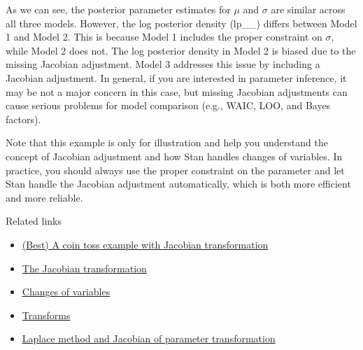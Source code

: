 \documentclass[
  letterpaper,
  DIV=11,
  numbers=noendperiod]{scrartcl}
\providecommand{\tightlist}{%
  \setlength{\itemsep}{0pt}\setlength{\parskip}{0pt}}\usepackage{longtable,booktabs,array}
\begin{document}
As we can see, the posterior parameter estimates for \(\mu\) and
\(\sigma\) are similar across all three models. However, the log
posterior density (lp\_\_) differs between Model 1 and Model 2. This is
because Model 1 includes the proper constraint on \(\sigma\), while
Model 2 does not. The log posterior density in Model 2 is biased due to
the missing Jacobian adjustment. Model 3 addresses this issue by
including a Jacobian adjustment. In general, if you are interested in
parameter inference, it may be not a major concern in this case, but
missing Jacobian adjustments can cause serious problems for model
comparison (e.g., WAIC, LOO, and Bayes factors).

Note that this example is only for illustration and help you understand
the concept of Jacobian adjustment and how Stan handles changes of
variables. In practice, you should always use the proper constraint on
the parameter and let Stan handle the Jacobian adjustment automatically,
which is both more efficient and more reliable.

Related links

\begin{itemize}
\tightlist
\item
  \href{https://rpubs.com/kaz_yos/stan_jacobian}{(Best) A coin toss
  example with Jacobian transformation}
\item
  \href{https://modelassist.epixanalytics.com/space/EA/26575402/The+Jacobian+transformation}{The
  Jacobian transformation}
\item
  \href{https://mc-stan.org/docs/stan-users-guide/reparameterization.html\#changes-of-variables}{Changes
  of variables}
\item
  \href{https://mc-stan.org/docs/reference-manual/transforms.html}{Transforms}
\item
  \href{https://users.aalto.fi/~ave/casestudies/Jacobian/jacobian.html}{Laplace
  method and Jacobian of parameter transformation}
\end{itemize}
\end{document}
